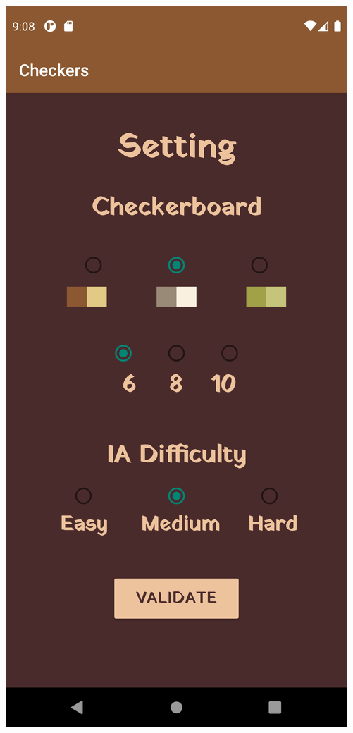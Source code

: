 \documentclass{article}
\begin{document}
\begin{enumerate}
\begin{center}
  \includegraphics[scale=0.1]{setting_en.png}

\end{center}
\end{enumerate}
\end{document}
